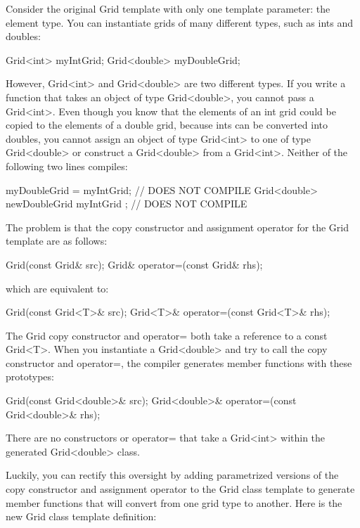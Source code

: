 Consider the original Grid template with only one template parameter: the element type. You can instantiate grids of many different types, such as ints and doubles:

\begin{cpp}
Grid<int> myIntGrid;
Grid<double> myDoubleGrid;
\end{cpp}

However, Grid<int> and Grid<double> are two different types. If you write a function that takes an object of type Grid<double>, you cannot pass a Grid<int>. Even though you know that the elements of an int grid could be copied to the elements of a double grid, because ints can be converted into doubles, you cannot assign an object of type Grid<int> to one of type Grid<double> or construct a Grid<double> from a Grid<int>. Neither of the following two lines compiles:

\begin{cpp}
myDoubleGrid = myIntGrid; // DOES NOT COMPILE
Grid<double> newDoubleGrid { myIntGrid }; // DOES NOT COMPILE
\end{cpp}

The problem is that the copy constructor and assignment operator for the Grid template are as follows:

\begin{cpp}
Grid(const Grid& src);
Grid& operator=(const Grid& rhs);
\end{cpp}

which are equivalent to:

\begin{cpp}
Grid(const Grid<T>& src);
Grid<T>& operator=(const Grid<T>& rhs);
\end{cpp}

The Grid copy constructor and operator= both take a reference to a const Grid<T>. When you instantiate a Grid<double> and try to call the copy constructor and operator=, the compiler generates member functions with these prototypes:

\begin{cpp}
Grid(const Grid<double>& src);
Grid<double>& operator=(const Grid<double>& rhs);
\end{cpp}

There are no constructors or operator= that take a Grid<int> within the generated Grid<double> class.

Luckily, you can rectify this oversight by adding parametrized versions of the copy constructor and assignment operator to the Grid class template to generate member functions that will convert from one grid type to another. Here is the new Grid class template definition:

